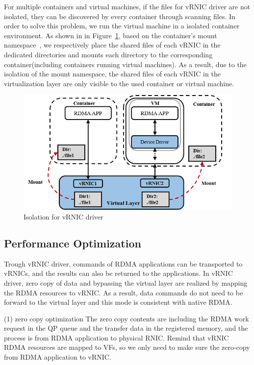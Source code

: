 For multiple containers and virtual machines, if the files for vRNIC driver are not isolated, they can be discovered by every container through scanning files. In order to solve this problem, we run the virtual machine in a isolated container environment. As shown in in Figure~\ref{fig:interface-isolate}, based on the container's mount namespace~\cite{mount-ns}, we respectively place the shared files of each vRNIC in the dedicated directories and mounts each directory to the corresponding container(including containers running virtual machines). As a result, due to the isolation of the mount namespace, the shared files of each vRNIC in the virtualization layer are only visible to the used container or virtual machine.  

\begin{figure}[!ht]
	\centering
	\includegraphics[width=1.0\linewidth]{images/interface-isolate}
	\caption{Isolation for vRNIC driver}
	\label{fig:interface-isolate}
\end{figure}


\subsection{Performance Optimization}
Trough vRNIC driver, commands of RDMA applications can be transported to vRNICs, and the results can also be returned to the applications. In vRNIC driver, zero copy of data and bypassing the virtual layer are realized by mapping the RDMA resources to vRNIC. As a result, data commands do not need to be forward to the virtual layer and this mode is consistent with native RDMA.

(1) zero copy optimization
The zero copy contents are including the RDMA work request in the QP queue and the transfer data in the registered memory, and the process is from RDMA application to physical RNIC. Remind that vRNIC RDMA resources are mapped to VFs, so we only need to make sure the zero-copy from RDMA application to vRNIC.

